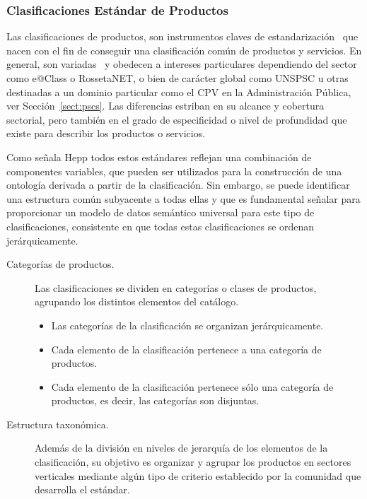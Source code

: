 \subsubsection{Clasificaciones Estándar de Productos}\label{semantica:pscs}
Las clasificaciones de productos, son instrumentos claves de estandarización~\cite{Leukel-standard} que nacen con el fin de
conseguir una clasificación común de productos y servicios. En general, son variadas~\cite{Leukel-ecatalog2005}
y obedecen a intereses particulares dependiendo del sector como e@Class o RossetaNET,
o bien de carácter global como \gls{UNSPSC} u otras destinadas a un dominio particular como el \gls{CPV} en la Administración Pública, ver Sección~\ref{sect:pscs}. Las diferencias
estriban en su alcance y cobertura sectorial, pero también en el grado de especificidad o nivel
de profundidad que existe para describir los productos o servicios.

Como señala Hepp\cite{HeppTrueComplexity,HeppEclass,HeppMethodology} todos estos
estándares reflejan una combinación de componentes variables, que pueden ser
utilizados para la construcción de una ontología derivada a partir de la clasificación.
Sin embargo, se puede identificar una estructura común subyacente a todas ellas y
que es fundamental señalar para proporcionar un modelo de datos semántico universal para este tipo de clasificaciones, consistente 
en que todas estas clasificaciones se ordenan jerárquicamente. 

\begin{description}
 \item [Categorías de productos.] Las clasificaciones se dividen en categorías o
clases de productos, agrupando los distintos elementos del catálogo.
\begin{itemize}
 \item Las categorías de la clasificación se organizan jerárquicamente.
 \item Cada elemento de la clasificación pertenece a una categoría de
productos.
 \item Cada elemento de la clasificación pertenece sólo una categoría de
productos, es decir, las categorías son disjuntas.
\end{itemize}

\item  [Estructura taxonómica.] Además de la división en niveles de jerarquía
de los elementos de la clasificación, su objetivo es organizar y agrupar los productos en
sectores verticales mediante algún tipo de criterio establecido por la comunidad
que desarrolla el estándar. 
 
\end{description}

